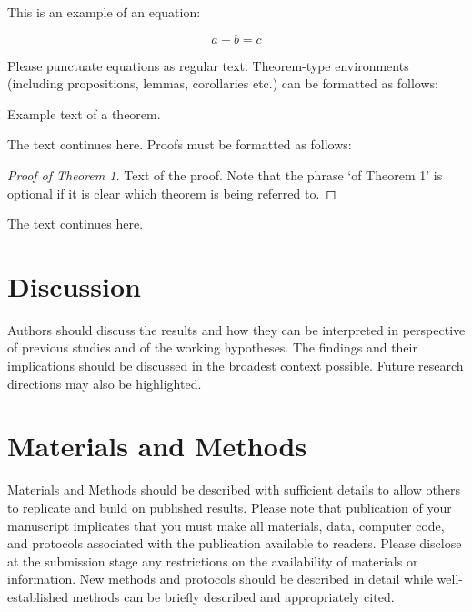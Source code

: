 \documentclass[hydrology,article,submit,moreauthors,pdftex]{Definitions/mdpi}
\begin{document}
This is an example of an equation:

\begin{equation}
a + b = c
\end{equation}

Please punctuate equations as regular text. Theorem-type environments (including propositions, lemmas, corollaries etc.) can be formatted as follows:
\begin{Theorem}
Example text of a theorem.
\end{Theorem}

The text continues here. Proofs must be formatted as follows:

\begin{proof}[Proof of Theorem 1]
Text of the proof. Note that the phrase `of Theorem 1' is optional if it is clear which theorem is being referred to.
\end{proof}
The text continues here.

\section{Discussion}

Authors should discuss the results and how they can be interpreted in perspective of previous studies and of the working hypotheses. The findings and their implications should be discussed in the broadest context possible. Future research directions may also be highlighted.

\section{Materials and Methods}

Materials and Methods should be described with sufficient details to allow others to replicate and build on published results. Please note that publication of your manuscript implicates that you must make all materials, data, computer code, and protocols associated with the publication available to readers. Please disclose at the submission stage any restrictions on the availability of materials or information. New methods and protocols should be described in detail while well-established methods can be briefly described and appropriately cited.
\end{document}
